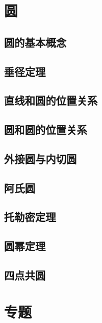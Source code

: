 \documentclass{ecnuthesis}
\begin{document}
\chapter{圆}
\section{圆的基本概念}
\clearpage
\section{垂径定理}
\clearpage
\section{直线和圆的位置关系}
\clearpage
\section{圆和圆的位置关系}
\clearpage
\section{外接圆与内切圆}
\clearpage
\section{阿氏圆}
\clearpage
\section{托勒密定理}
\clearpage
\section{圆幂定理}
\clearpage
\section{四点共圆}
\clearpage
\chapter{专题}
\backmatter
\end{document}
